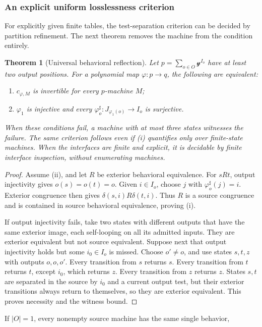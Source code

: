 \documentclass[11pt]{article}
\newtheorem{theorem}{Theorem}[section]
\theoremstyle{definition}
\theoremstyle{remark}\newtheorem{remark}[theorem]{Remark}
\begin{document}
\subsubsection{An explicit uniform losslessness criterion}
For explicitly given finite tables, the test-separation criterion can be
decided by partition refinement. The next theorem removes the machine from the
condition entirely.

\begin{theorem}[Universal behavioral reflection]\label{p:thm:uniform}
Let $p=\sum_{o\in O}\mathcal y^{I_o}$ have at least two output positions.
For a polynomial map $\varphi:p\to q$, the following are equivalent:
\begin{enumerate}[label=\textup{(\roman*)}]
\item $c_{\varphi,M}$ is invertible for every $p$-machine $M$;
\item $\varphi_1$ is injective and every
$\varphi_o^\sharp:J_{\varphi_1(o)}\to I_o$ is surjective.
\end{enumerate}
When these conditions fail, a machine with at most three states witnesses
the failure. The same criterion follows even if (i) quantifies only over finite-state
machines. When the interfaces are finite and explicit, it is decidable by
finite interface inspection, without enumerating machines.
\end{theorem}
\begin{proof}
Assume (ii), and let $R$ be exterior behavioral equivalence. For $sRt$,
output injectivity gives $o(s)=o(t)=o$. Given $i\in I_o$, choose $j$ with
$\varphi_o^\sharp(j)=i$. Exterior congruence then gives
$\delta(s,i)R\delta(t,i)$. Thus $R$ is a source congruence and is contained
in source behavioral equivalence, proving (i).

If output injectivity fails, take two states with different outputs that
have the same exterior image, each self-looping on all its admitted
inputs. They are exterior equivalent but not source equivalent.
Suppose next that output injectivity holds but some $i_0\in I_o$ is missed.
Choose $o'\ne o$, and use states $s,t,z$ with outputs $o,o,o'$.
Every transition from $s$ returns $s$. Every transition from $t$ returns
$t$, except $i_0$, which returns $z$. Every transition from $z$ returns
$z$. States $s,t$ are separated in the source by $i_0$ and a current
output test, but their exterior transitions always return to themselves,
so they are exterior equivalent. This proves necessity and the witness
bound.
\end{proof}
If $|O|=1$, every nonempty source machine has the same single behavior,
\end{document}
